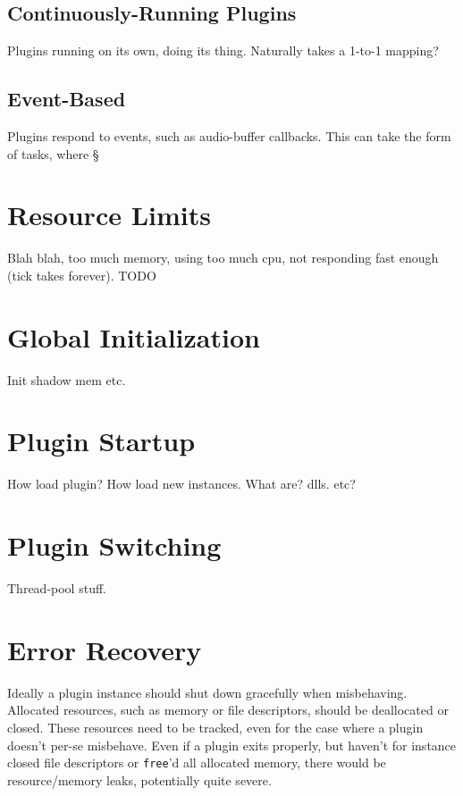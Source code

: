 \subsection {Continuously-Running Plugins}

Plugins running on its own, doing its thing. Naturally takes a 1-to-1 mapping?

\subsection {Event-Based}

Plugins respond to events, such as audio-buffer callbacks. This can take the
form of tasks, where §


\section {Resource Limits}

Blah blah, too much memory, using too much cpu, not responding fast enough (tick
takes forever). TODO


\section {Global Initialization}

Init shadow mem etc.


\section {Plugin Startup}

How load plugin? How load new instances. What are? dlls. etc?


\section {Plugin Switching}

Thread-pool stuff.


\section {Error Recovery}

Ideally a plugin instance should shut down gracefully when misbehaving.
Allocated resources, such as memory or file descriptors, should be deallocated
or closed. These resources need to be tracked, even for the case where a plugin
doesn't per-se misbehave. Even if a plugin exits properly, but haven't for
instance closed file descriptors or \texttt{free}'d all allocated memory, there
would be resource/memory leaks, potentially quite severe.

